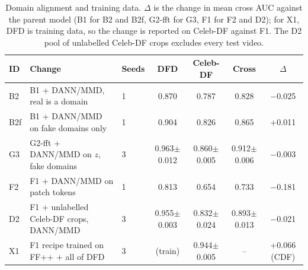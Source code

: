 \begin{table}[t]
\centering
\footnotesize
\caption{Domain alignment and training data. $\Delta$ is the change in mean cross AUC against the parent model (B1 for B2 and B2f, G2-fft for G3, F1 for F2 and D2); for X1, DFD is training data, so the change is reported on Celeb-DF against F1. The D2 pool of unlabelled Celeb-DF crops excludes every test video.}
\label{tab:align}
\begin{tabular}{lllcccc}
\toprule
ID & Change & Seeds & DFD & Celeb-DF & Cross & $\Delta$ \\
\midrule
B2 & B1 + DANN/MMD, real is a domain & 1 & 0.870 & 0.787 & 0.828 & $-$0.025 \\
B2f & B1 + DANN/MMD on fake domains only & 1 & 0.904 & 0.826 & 0.865 & +0.011 \\
G3 & G2-fft + DANN/MMD on $z$, fake domains & 3 & 0.963$\pm$0.012 & 0.860$\pm$0.005 & 0.912$\pm$0.006 & $-$0.003 \\
F2 & F1 + DANN/MMD on patch tokens & 1 & 0.813 & 0.654 & 0.733 & $-$0.181 \\
D2 & F1 + unlabelled Celeb-DF crops, DANN/MMD & 3 & 0.955$\pm$0.003 & 0.832$\pm$0.024 & 0.893$\pm$0.013 & $-$0.021 \\
\midrule
X1 & F1 recipe trained on FF++ + all of DFD & 3 & (train) & 0.944$\pm$0.005 & -- & +0.066 (CDF) \\
\bottomrule
\end{tabular}
\end{table}
